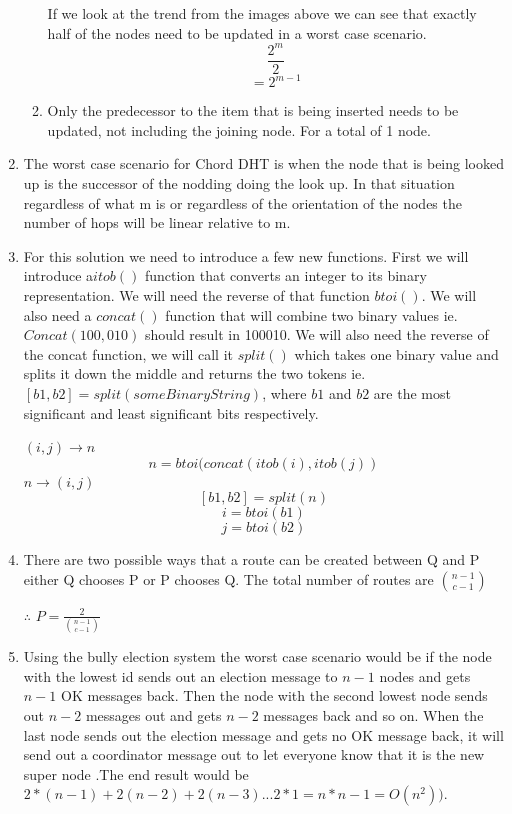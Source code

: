 \documentclass{article}
\begin{document}
\begin{enumerate}
\begin{enumerate}
\begin{figure}[ht!]
\end{figure}


  If we look at the trend from the images above we can see that exactly half of the nodes need to be updated in a worst case scenario. 
\[
\frac{2^m} {2}
\]
\[
=2^{m-1}
\]



	\item Only the predecessor to the item that is being inserted needs to be updated, not including the joining node. For a total of 1 node.
\end{enumerate}

\item The worst case scenario for Chord DHT is when the node that is being looked up is the successor of the nodding doing the look up. In that situation regardless of what m is or regardless of the orientation of the nodes the number of hops will be linear relative to m. 

\item For this solution we need to introduce a few new functions. First we will introduce a\( itob()\) function that converts an integer to its binary representation. We will need the reverse of that function \(btoi()\). We will also need a \(concat()\) function that will combine two binary values ie. \(Concat(100,010)\) should result in 100010.  We will also need the reverse of the concat function, we will call it \(split()\) which takes one binary value and splits it down the middle and returns the two tokens ie. \([b1,b2]=split(someBinaryString)\), where \( b1\) and \(b2\) are the most significant and least significant bits respectively.

\((i,j)\rightarrow n\)
\[
n=btoi(concat(itob(i),itob(j))
\]
\(n\rightarrow(i,j)\)
\[
[b1,b2]=split(n)
\]
\[
i=btoi(b1)
\]
\[
j=btoi(b2)
\]
	
\item
There are two possible ways that a route can be created between Q and P either Q chooses P or P chooses Q. The total number of routes are \( \binom{n-1}{c-1}\)

\centerline{\Large$ \therefore $
\(
 P= \frac {2}{\binom{n-1}{c-1}}
\)
}

\item Using the bully election system the worst case scenario would be if the node with the lowest id sends out an election message to \(n-1\) nodes and gets \(n-1\) OK messages back. Then the node with the second lowest node sends out \(n-2\) messages out and gets \(n-2\) messages back and so on. When the last node sends out the election message and gets no OK message back, it will send out a coordinator message out to let everyone know that it is the new super node .The end result would be \(2*(n-1)+2(n-2)+2(n-3)... 2*1= n*n-1 = O(n^2)) \).


\end{enumerate}
\end{document}
